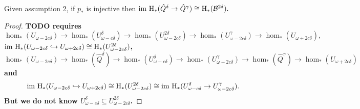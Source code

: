 \begin{lemma}
    Given assumption 2, if $p_*$ is injective then $\mathrm{im}~\mathrm{H}_*(\hat{Q}^\delta \to \hat{Q}^{\gamma})\cong \mathrm{H}_*({\mathcal{B}}^{2\delta}).$
\end{lemma}
\begin{proof}
    \textbf{TODO requires
        \[ \hom_*(U_{\omega - 2c\delta})\to \hom_*(U_{\omega - c\delta}^\delta)\to \hom_*(U_{\omega - 2c\delta}^{2\delta})\to\hom_*(U_{\omega - 2c\delta}^\gamma)\to\hom_*(U_{\omega + 2c\delta}),\]
        $\mathrm{im}~\mathrm{H}_*(U_{\omega - 2c\delta}\hookrightarrow U_{\omega + 2c\delta})\cong\mathrm{H}_*(U_{\omega - 2c\delta}^{2\delta})$,
        \[ \hom_*(U_{\omega - 2c\delta})\to\hom_*(\hat{Q}^\delta)\to\hom_*(U_{\omega - c\delta}^\delta)\to\hom_*(U_{\omega - 2c\delta} ^\gamma)\to\hom_*(\hat{Q}^\gamma)\to\hom_*(U_{\omega+2c\delta})\]
        and \[\mathrm{im}~\mathrm{H}_*(U_{\omega - 2c\delta}\hookrightarrow U_{\omega + 2c\delta})\cong \mathrm{H}_*(U_{\omega - 2c\delta}^{2\delta})\cong \mathrm{im}~\mathrm{H}_*(U_{\omega - c\delta}^\delta\to U_{\omega - 2c\delta}^\gamma).\]
        But we do not know $U_{\omega - c\delta}^\delta\subseteq U_{\omega - 2c\delta}^{2\delta}$.}
\end{proof}
%
%

